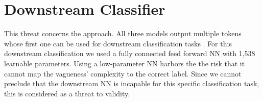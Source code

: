 \section{Downstream Classifier}
\label{chp:threats_to_validity:sec:downstream_classifier}

This threat concerns the approach.
All three models output multiple tokens whose first one can be used for downstream classification tasks \parencite{Devlin:2018}.
For this downstream classification we used a fully connected feed forward \ac{NN} with 1,538 learnable parameters.
Using a low-parameter \ac{NN} harbors the the risk that it cannot map the vagueness' complexity to the correct label.
Since we cannot preclude that the downstream \ac{NN} is incapable for this specific classification task, this is considered as a threat to validity.

